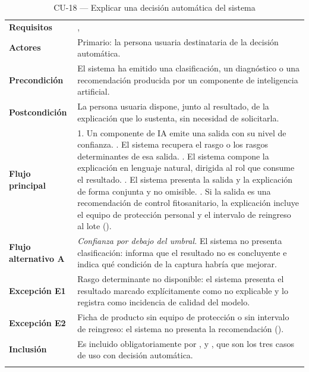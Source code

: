 \begin{longtable}{|L{3.4cm}|L{12.0cm}|}
\hline
{}\\
\hline
\textbf{Requisitos} & ,  \\ \hline
\textbf{Actores} & Primario: la persona usuaria destinataria de la decisión automática. \\ \hline
\textbf{Precondición} & El sistema ha emitido una clasificación, un diagnóstico o una recomendación producida por un componente de inteligencia artificial. \\ \hline
\textbf{Postcondición} & La persona usuaria dispone, junto al resultado, de la explicación que lo sustenta, sin necesidad de solicitarla. \\ \hline
\textbf{Flujo principal} & 1. Un componente de IA emite una salida con su nivel de confianza. . El sistema recupera el rasgo o los rasgos determinantes de esa salida. . El sistema compone la explicación en lenguaje natural, dirigida al rol que consume el resultado. . El sistema presenta la salida y la explicación de forma conjunta y no omisible. . Si la salida es una recomendación de control fitosanitario, la explicación incluye el equipo de protección personal y el intervalo de reingreso al lote (). \\ \hline
\textbf{Flujo alternativo A} & \emph{Confianza por debajo del umbral.} El sistema no presenta clasificación: informa que el resultado no es concluyente e indica qué condición de la captura habría que mejorar. \\ \hline
\textbf{Excepción E1} & Rasgo determinante no disponible: el sistema presenta el resultado marcado explícitamente como no explicable y lo registra como incidencia de calidad del modelo. \\ \hline
\textbf{Excepción E2} & Ficha de producto sin equipo de protección o sin intervalo de reingreso: el sistema no presenta la recomendación (). \\ \hline
\textbf{Inclusión} & Es incluido obligatoriamente por ,  y , que son los tres casos de uso con decisión automática. \\ \hline
\caption{CU-18 --- Explicar una decisión automática del sistema}
\end{longtable}
